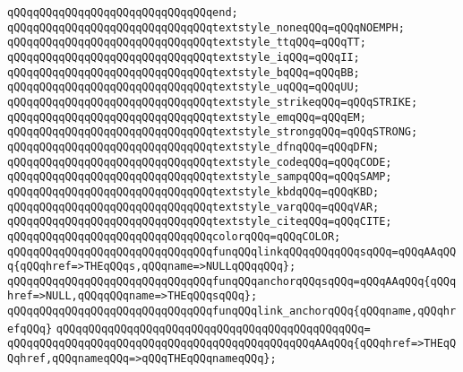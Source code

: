 \verb|qQQqqQQqqQQqqQQqqQQqqQQqqQQqqQQqend;|\newline
\newline
\verb|qQQqqQQqqQQqqQQqqQQqqQQqqQQqqQQqtextstyle_noneqQQq=qQQqNOEMPH;|\newline
\verb|qQQqqQQqqQQqqQQqqQQqqQQqqQQqqQQqtextstyle_ttqQQq=qQQqTT;|\newline
\verb|qQQqqQQqqQQqqQQqqQQqqQQqqQQqqQQqtextstyle_iqQQq=qQQqII;|\newline
\verb|qQQqqQQqqQQqqQQqqQQqqQQqqQQqqQQqtextstyle_bqQQq=qQQqBB;|\newline
\verb|qQQqqQQqqQQqqQQqqQQqqQQqqQQqqQQqtextstyle_uqQQq=qQQqUU;|\newline
\verb|qQQqqQQqqQQqqQQqqQQqqQQqqQQqqQQqtextstyle_strikeqQQq=qQQqSTRIKE;|\newline
\verb|qQQqqQQqqQQqqQQqqQQqqQQqqQQqqQQqtextstyle_emqQQq=qQQqEM;|\newline
\verb|qQQqqQQqqQQqqQQqqQQqqQQqqQQqqQQqtextstyle_strongqQQq=qQQqSTRONG;|\newline
\verb|qQQqqQQqqQQqqQQqqQQqqQQqqQQqqQQqtextstyle_dfnqQQq=qQQqDFN;|\newline
\verb|qQQqqQQqqQQqqQQqqQQqqQQqqQQqqQQqtextstyle_codeqQQq=qQQqCODE;|\newline
\verb|qQQqqQQqqQQqqQQqqQQqqQQqqQQqqQQqtextstyle_sampqQQq=qQQqSAMP;|\newline
\verb|qQQqqQQqqQQqqQQqqQQqqQQqqQQqqQQqtextstyle_kbdqQQq=qQQqKBD;|\newline
\verb|qQQqqQQqqQQqqQQqqQQqqQQqqQQqqQQqtextstyle_varqQQq=qQQqVAR;|\newline
\verb|qQQqqQQqqQQqqQQqqQQqqQQqqQQqqQQqtextstyle_citeqQQq=qQQqCITE;|\newline
\verb|qQQqqQQqqQQqqQQqqQQqqQQqqQQqqQQqcolorqQQq=qQQqCOLOR;|\newline
\newline
\verb|qQQqqQQqqQQqqQQqqQQqqQQqqQQqqQQqfunqQQqlinkqQQqqQQqqQQqsqQQq=qQQqAAqQQq{qQQqhref=>THEqQQqs,qQQqname=>NULLqQQqqQQq};|\newline
\verb|qQQqqQQqqQQqqQQqqQQqqQQqqQQqqQQqfunqQQqanchorqQQqsqQQq=qQQqAAqQQq{qQQqhref=>NULL,qQQqqQQqname=>THEqQQqsqQQq};|\newline
\newline
\verb|qQQqqQQqqQQqqQQqqQQqqQQqqQQqqQQqfunqQQqlink_anchorqQQq{qQQqname,qQQqhrefqQQq}|\newline
\verb|qQQqqQQqqQQqqQQqqQQqqQQqqQQqqQQqqQQqqQQqqQQqqQQq=|\newline
\verb|qQQqqQQqqQQqqQQqqQQqqQQqqQQqqQQqqQQqqQQqqQQqqQQqAAqQQq{qQQqhref=>THEqQQqhref,qQQqnameqQQq=>qQQqTHEqQQqnameqQQq};|\newline
